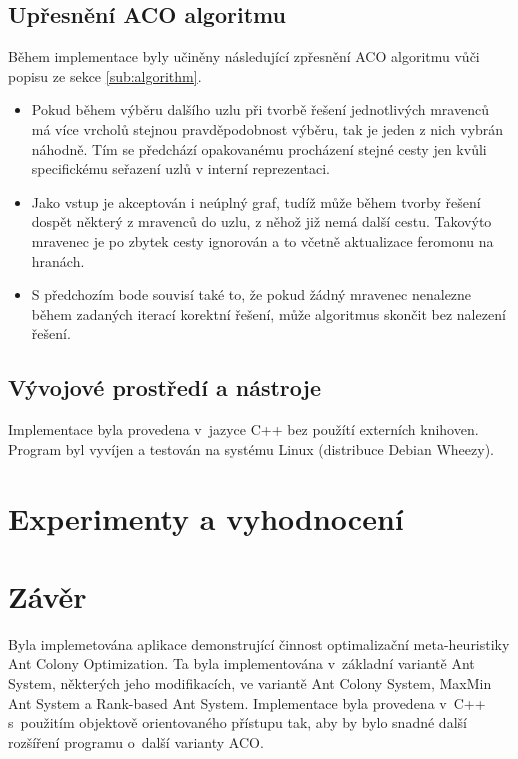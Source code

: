 \documentclass[a4paper, 12pt]{article}
\begin{document}
\subsection{Upřesnění ACO algoritmu}
Během implementace byly učiněny následující zpřesnění ACO algoritmu vůči popisu ze sekce \ref{sub:algorithm}.
\begin{itemize}
  \item Pokud během výběru dalšího uzlu při tvorbě řešení jednotlivých mravenců má více vrcholů stejnou pravděpodobnost výběru, tak je jeden z nich vybrán náhodně.
  Tím se předchází opakovanému procházení stejné cesty jen kvůli specifickému seřazení uzlů v interní reprezentaci.
  \item Jako vstup je akceptován i neúplný graf, tudíž může během tvorby řešení dospět některý z mravenců do uzlu, z něhož již nemá další cestu. Takovýto mravenec
  je po zbytek cesty ignorován a to včetně aktualizace feromonu na hranách.
  \item S předchozím bode souvisí také to, že pokud žádný mravenec nenalezne během zadaných iterací korektní řešení, může algoritmus skončit bez nalezení
  řešení.
\end{itemize}

\subsection{Vývojové prostředí a nástroje}
Implementace byla provedena v~jazyce C++ bez použítí externích knihoven. Program byl vyvíjen a testován na systému Linux (distribuce Debian Wheezy).

\section{Experimenty a vyhodnocení}
\label{sec:eval}

\section{Závěr}
\label{sec:concl}
Byla implemetována aplikace demonstrující činnost optimalizační meta-heuristiky Ant Colony Optimization. 
Ta byla implementována v~základní variantě Ant System, některých
jeho modifikacích, ve variantě Ant Colony System, MaxMin Ant System a Rank-based Ant System. Implementace byla provedena v~C++ s~použitím objektově orientovaného
přístupu tak, aby by bylo snadné další rozšíření programu o~další varianty ACO.
\end{document}
